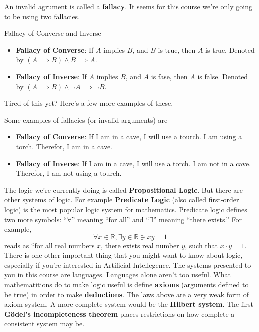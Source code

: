 An invalid agrument is called a {\bf fallacy}. It seems for this course we're only going to be using two fallacies.

\begin{boxdefine}{Fallacy of Converse and Inverse}{}
	\begin{itemize}
		\item {\bf Fallacy of Converse}: If $A$ implies $B$, and $B$ is true, then $A$ is true. Denoted by $(A \implies B) \land B \implies A$.
		\item {\bf Fallacy of Inverse}: If $A$ implies $B$, and $A$ is fase, then $A$ is false. Denoted by $(A \implies B) \land \lnot A \implies \lnot B$.
	\end{itemize}
\end{boxdefine}

Tired of this yet? Here's a few more examples of these.

\begin{boxexample}{}{}
	Some examples of fallacies (or invalid arguments) are

	\begin{itemize}
		\item {\bf Fallacy of Converse}: If I am in a cave, I will use a tourch. I am using a torch. Therefor, I am in a cave.
		\item {\bf Fallacy of Inverse}: If I am in a cave, I will use a torch. I am not in a cave. Therefor, I am not using a tourch.
	\end{itemize}
\end{boxexample}

\begin{boxremark*}{}{}
	The logic we're currently doing is called {\bf Propositional Logic}. But there are other systems of logic. For example {\bf Predicate Logic} (also called first-order logic) is the most popular logic system for mathematics. Predicate logic defines two more symbols: ``$\forall$'' meaning ``for all'' and ``$\exists$'' meaning ``there exists.'' For example,
	\[
		\forall x \in \mathbb{R}, \exists y \in \mathbb{R} \ni xy = 1
	\]
	reads as ``for all real numbers $x$, there exists real number $y$, such that $ x\cdot y=1.$ There is one other important thing that you might want to know about logic, especially if you're interested in Artificial Intellegence. The systems presented to you in this course are languages. Languages alone aren't too useful. What mathematitions do to make logic useful is define {\bf axioms} (arguments defined to be true) in order to make {\bf deductions}. The laws above are a very weak form of axiom system. A more complete system would be the {\bf Hilbert system}. The first {\bf G\"odel's incompleteness theorem} places restrictions on how complete a consistent system may be.
\end{boxremark*}


